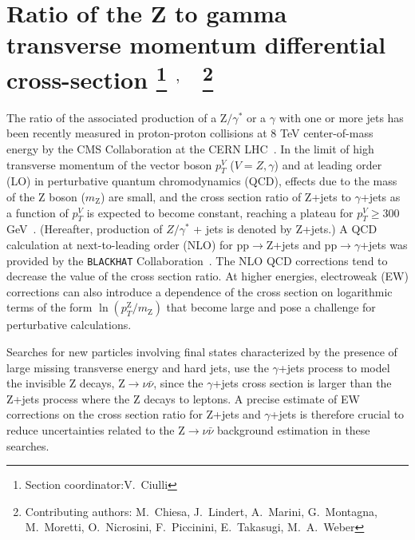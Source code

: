 \documentclass[11pt]{cernrep} \usepackage{graphicx,epsfig} 
\begin{document}
\section{Ratio of the Z to gamma transverse momentum differential cross-section \protect\footnote{Section
    coordinator:V.~Ciulli} $^{,}$ ~\protect\footnote{Contributing authors: M.~Chiesa, J.~Lindert, A.~Marini,  
    G.~Montagna, M.~Moretti, O.~Nicrosini, F.~Piccinini, E.~Takasugi, M.~A.~Weber }}

The ratio of the associated production of a $\mathrm{Z}/\gamma^*$ or a $\gamma$ with one or more jets has been recently measured in
proton-proton collisions at 8 TeV center-of-mass energy by the CMS Collaboration at the CERN
LHC~\cite{Khachatryan:2015ira}. In the limit of high transverse momentum of the vector boson $p_T^{V}$
($V=Z,\gamma$) and at leading order (LO) in perturbative quantum chromodynamics (QCD), effects due to the mass of the Z
boson ($m_\mathrm{Z}$) are small, and the 
cross section ratio of Z+jets to $\gamma$+jets as a function of $p_T^{V}$ is expected to become constant, reaching a
plateau for $p_T^{V} \geq 300$ GeV~\cite{StirlingPaperZGamma}. (Hereafter, production of $Z/\gamma^*$ + jets is denoted by
Z+jets.) A QCD calculation at next-to-leading order (NLO) for pp$\to$Z+jets and pp$\to\gamma$+jets was provided by
the {\tt BLACKHAT} Collaboration~\cite{BlackHat}.  The NLO QCD corrections tend to decrease the value of
the cross section ratio. At higher energies, electroweak (EW) corrections 
can also introduce a dependence of the cross section on logarithmic terms of the form
$\ln(p_T^{\mathrm{Z}}/m_{\mathrm{Z}})$ that become large and pose a challenge for perturbative calculations.  

Searches for new particles involving final states characterized by the presence of large missing transverse
energy and hard jets, use the $\gamma$+jets process to model the invisible Z decays, Z$\to\nu\bar{\nu}$, since the
$\gamma$+jets cross section is larger than the Z+jets process where the Z decays to leptons. A precise estimate of EW
corrections on the cross section ratio for Z+jets and $\gamma$+jets is therefore crucial to reduce uncertainties related
to the Z$\to\nu\bar{\nu}$ background estimation in these searches. 
\end{document}
